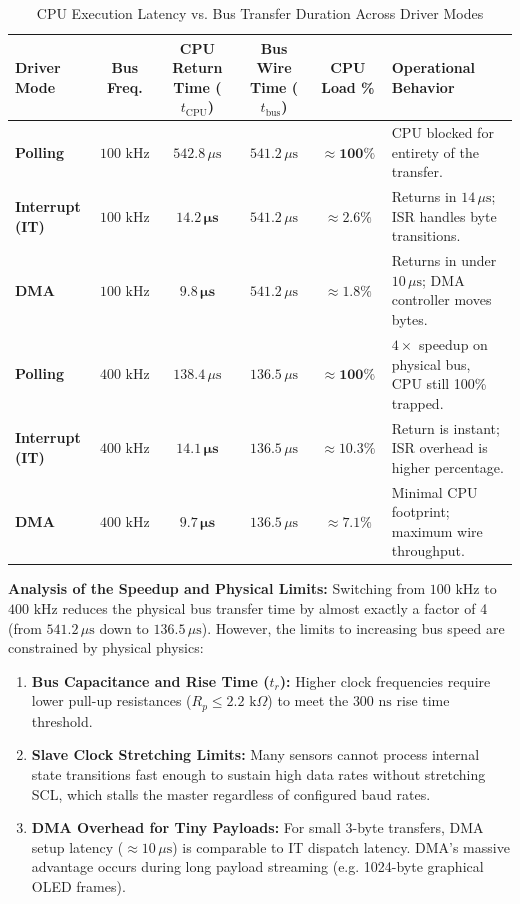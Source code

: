 \documentclass[11pt,a4paper]{article}
\begin{document}
\begin{table}[h!]
\centering
\small
\caption{CPU Execution Latency vs. Bus Transfer Duration Across Driver Modes}
\vspace{4pt}
\begin{tabularx}{\textwidth}{l c c c c X}
\toprule
\textbf{Driver Mode} & \textbf{Bus Freq.} & \textbf{CPU Return Time ($t_{\text{CPU}}$)} & \textbf{Bus Wire Time ($t_{\text{bus}}$)} & \textbf{CPU Load \%} & \textbf{Operational Behavior} \\
\midrule
\textbf{Polling} & $100\text{ kHz}$ & $542.8\,\mu\text{s}$ & $541.2\,\mu\text{s}$ & $\mathbf{\approx 100\%}$ & CPU blocked for entirety of the transfer. \\
\textbf{Interrupt (IT)} & $100\text{ kHz}$ & $\mathbf{14.2\,\mu\text{s}}$ & $541.2\,\mu\text{s}$ & $\mathbf{\approx 2.6\%}$ & Returns in $14\,\mu\text{s}$; ISR handles byte transitions. \\
\textbf{DMA} & $100\text{ kHz}$ & $\mathbf{9.8\,\mu\text{s}}$ & $541.2\,\mu\text{s}$ & $\mathbf{\approx 1.8\%}$ & Returns in under $10\,\mu\text{s}$; DMA controller moves bytes. \\
\midrule
\textbf{Polling} & $400\text{ kHz}$ & $138.4\,\mu\text{s}$ & $136.5\,\mu\text{s}$ & $\mathbf{\approx 100\%}$ & $4\times$ speedup on physical bus, CPU still 100\% trapped. \\
\textbf{Interrupt (IT)} & $400\text{ kHz}$ & $\mathbf{14.1\,\mu\text{s}}$ & $136.5\,\mu\text{s}$ & $\mathbf{\approx 10.3\%}$ & Return is instant; ISR overhead is higher percentage. \\
\textbf{DMA} & $400\text{ kHz}$ & $\mathbf{9.7\,\mu\text{s}}$ & $136.5\,\mu\text{s}$ & $\mathbf{\approx 7.1\%}$ & Minimal CPU footprint; maximum wire throughput. \\
\bottomrule
\end{tabularx}
\end{table}

\begin{theorybox}
\textbf{Analysis of the Speedup and Physical Limits:}
Switching from $100\text{ kHz}$ to $400\text{ kHz}$ reduces the physical bus transfer time by almost exactly a factor of 4 (from $541.2\,\mu\text{s}$ down to $136.5\,\mu\text{s}$). However, the limits to increasing bus speed are constrained by physical physics:
\begin{enumerate}
    \item \textbf{Bus Capacitance and Rise Time ($t_r$):} Higher clock frequencies require lower pull-up resistances ($R_p \le 2.2\text{ k}\Omega$) to meet the $300\text{ ns}$ rise time threshold.
    \item \textbf{Slave Clock Stretching Limits:} Many sensors cannot process internal state transitions fast enough to sustain high data rates without stretching SCL, which stalls the master regardless of configured baud rates.
    \item \textbf{DMA Overhead for Tiny Payloads:} For small 3-byte transfers, DMA setup latency ($\approx 10\,\mu\text{s}$) is comparable to IT dispatch latency. DMA's massive advantage occurs during long payload streaming (e.g. 1024-byte graphical OLED frames).
\end{enumerate}
\end{theorybox}
\end{document}
